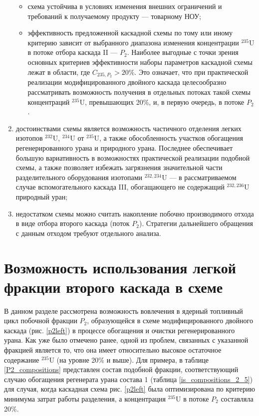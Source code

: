 \begin{enumerate}
\begin{itemize}
        \item схема устойчива в условиях изменения внешних ограничений и требований к получаемому продукту --- товарному НОУ;
        \item эффективность предложенной каскадной схемы по тому или иному критерию зависит от выбранного диапазона изменения концентрации $^{235}$U в потоке отбора каскада II --- $P_2$. Наиболее выгодные с точки зрения основных критериев эффективности наборы параметров каскадной схемы лежат в области, где $C_{235,{P_2}} > 20\%$. Это означает, что при практической реализации модифицированного двойного каскада целесообразно рассматривать возможность получения в отдельных потоках такой схемы концентраций $^{235}$U, превышающих 20\%, и, в первую очередь, в потоке $P_2$.
    \end{itemize}   
    \item достоинствами схемы является возможность частичного отделения легких изотопов $^{232}$U, $^{234}$U от $^{235}$U, а также обособленность участков обогащения регенерированного урана и природного урана. Последнее обеспечивает большую вариативность в возможностях практической реализации подобной схемы, а также позволяет избежать загрязнения значительной части разделительного оборудования изотопами $^{232,234}$U --- в рассматриваемом случае вспомогательного каскада III, обогащающего не содержащий $^{232,236}$U природный уран;
    \item недостатком схемы можно считать накопление побочно производимого отхода в виде отбора второго каскада (поток $P_2$). Стратегии дальнейшего обращения с данным отходом требуют отдельного анализа.
\end{enumerate}


\section{Возможность использования легкой фракции второго каскада в схеме}

В данном разделе рассмотрена возможность вовлечения в ядерный топливный цикл побочной фракции $P_2$, образующейся в схеме модифицированного двойного каскада (рис. \ref{p2left}) в процессе обогащения и очистки регенерированного урана. Как уже было отмечено ранее, одной из проблем, связанных с указанной фракцией является то, что она имеет относительно высокое остаточное содержание $^{235}$U (на уровне 20\% и выше). Для примера, в таблице \ref{P2_compositions} представлен состав подобной фракции, соответствующий случаю обогащения регенерата урана состава 1 (таблица \ref{is_compositions_2_5}) для случая, когда каскадная схема рис. \ref{p2left} была оптимизирована по критерию минимума затрат работы разделения, а концентрация $^{235}$U в потоке $P_2$ составляла 20\%. 

